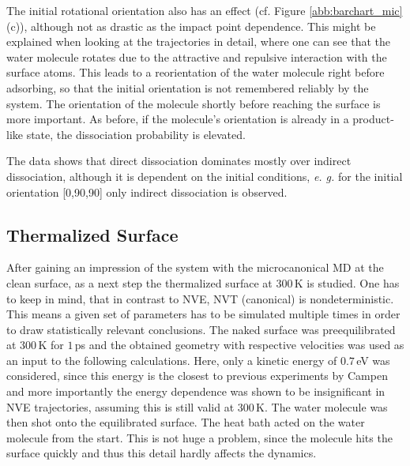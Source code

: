 \documentclass[11pt,DIV=13,BCOR=5mm,a4paper,headinclude]{scrbook}
\begin{document}
The initial rotational orientation also has an effect (cf.
Figure \ref{abb:barchart_mic}(c)), although not as drastic as the impact point dependence.
This might be explained when looking at the trajectories in detail, where one can see that the water molecule rotates due to the attractive and repulsive interaction with the surface atoms.
This leads to a reorientation of the water molecule right before adsorbing, so that the initial orientation is not remembered reliably by the system.
The orientation of the molecule shortly before reaching the surface is more important.
As before, if the molecule's orientation is already in a product-like state, the dissociation probability is elevated.


The data shows that direct dissociation dominates mostly over indirect dissociation, although it is dependent on the initial conditions, \textit{e.
g.} for the initial orientation [0,90,90] only indirect dissociation is observed.

 
\subsection{Thermalized Surface}\label{therm_surf}
After gaining an impression of the system with the microcanonical MD at the clean surface, as a next step the thermalized surface at $300\,$K is studied.
One has to keep in mind, that in contrast to NVE, NVT (canonical) is nondeterministic.
This means a given set of parameters has to be simulated multiple times in order to draw statistically relevant conclusions.
The naked surface was preequilibrated at $300\,$K for $1\,$ps and the obtained geometry with respective velocities was used as an input to the following calculations.
Here, only a kinetic energy of $0.7\,$eV was considered, since this energy is the closest to previous experiments by Campen and more importantly the energy dependence was shown to be insignificant in NVE trajectories, assuming this is still valid at $300\,$K.
The water molecule was then shot onto the equilibrated surface.
The heat bath acted on the water molecule from the start.
This is not huge a problem, since the molecule hits the surface quickly and thus this detail hardly affects the dynamics.
\end{document}
